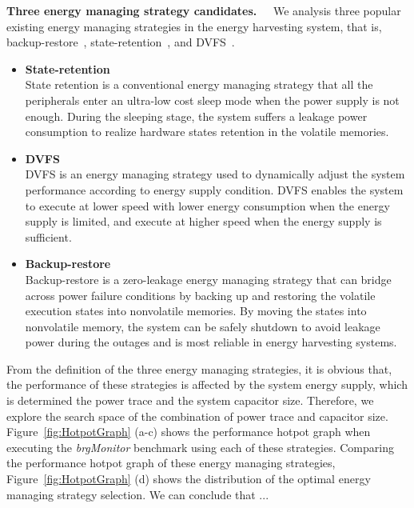 \textbf{Three energy managing strategy candidates.\ \ }
We analysis three popular existing energy managing strategies in the energy harvesting system, that is, backup-restore~\cite{Ma2015Architecture}, state-retention~\cite{wang2017a130nm}, and DVFS~\cite{fletcher2017powerDVFS}.
\begin{itemize}

\item \textbf{State-retention}\\ 
State retention is a conventional energy managing strategy that all the peripherals enter an ultra-low cost sleep mode when the power supply is not enough.
During the sleeping stage, the system suffers a leakage power consumption to realize hardware states retention in the volatile memories.

\item \textbf{DVFS}\\ 
DVFS is an energy managing strategy used to dynamically adjust the system performance according to energy supply condition.
DVFS enables the system to execute at lower speed with lower energy consumption when the energy supply is limited, and execute at higher speed when the energy supply is sufficient.

\item \textbf{Backup-restore}\\ 
Backup-restore is a zero-leakage energy managing strategy that can bridge across power failure conditions by backing up and restoring the volatile execution states into nonvolatile memories. 
By moving the states into nonvolatile memory, the system can be safely shutdown to avoid leakage power during the outages and is most reliable in energy harvesting systems.

\end{itemize}

From the definition of the three energy managing strategies, it is obvious that, the performance of these strategies is affected by the system energy supply, which is determined the power trace and the system capacitor size.
Therefore, we explore the search space of the combination of power trace and capacitor size.
Figure~\ref{fig:HotpotGraph} (a-c) shows the performance hotpot graph when executing the \emph{brgMonitor} benchmark using each of these strategies.
Comparing the performance hotpot graph of these energy managing strategies, Figure~\ref{fig:HotpotGraph} (d) shows the distribution of the optimal energy managing strategy selection.
We can conclude that ...  

